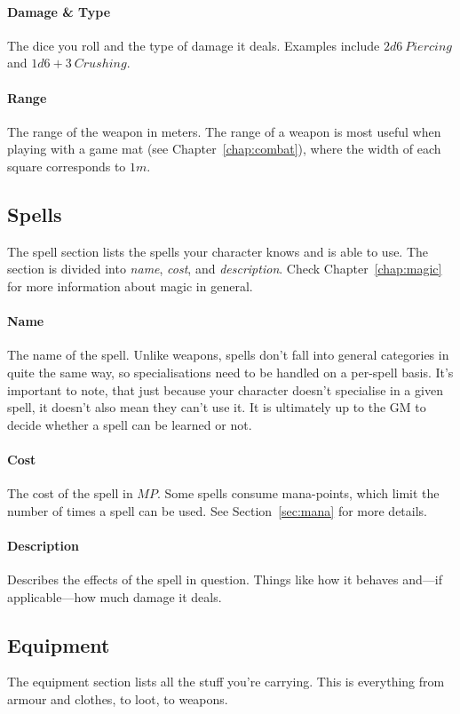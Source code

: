 \paragraph{Damage \& Type} The dice you roll and the type of damage it deals.
Examples include $2d6\ \mathit{Piercing}$ and $1d6+3\ \mathit{Crushing}$.

\paragraph{Range} The range of the weapon in meters.
The range of a weapon is most useful when playing with a game mat (see Chapter~\ref{chap:combat}), where the width of each square corresponds to $1m$.

\subsection{Spells}
The spell section lists the spells your character knows and is able to use.
The section is divided into \textit{name}, \textit{cost}, and \textit{description}.
Check Chapter~\ref{chap:magic} for more information about magic in general.

\paragraph{Name} The name of the spell.
Unlike weapons, spells don't fall into general categories in quite the same way, so specialisations need to be handled on a per-spell basis.
It's important to note, that just because your character doesn't specialise in a given spell, it doesn't also mean they can't use it.
It is ultimately up to the GM to decide whether a spell can be learned or not.

\paragraph{Cost} The cost of the spell in $MP$.
Some spells consume mana-points, which limit the number of times a spell can be used.
See Section~\ref{sec:mana} for more details.

\paragraph{Description} Describes the effects of the spell in question.
Things like how it behaves and---if applicable---how much damage it deals.

\subsection{Equipment}
The equipment section lists all the stuff you're carrying.
This is everything from armour and clothes, to loot, to weapons.


